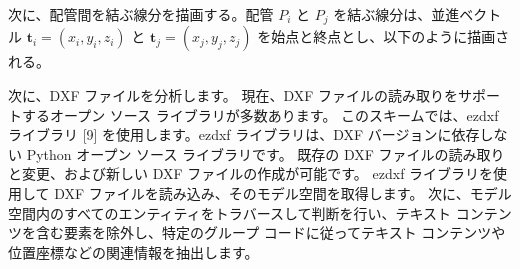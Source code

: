 次に、配管間を結ぶ線分を描画する。配管 \( P_i \) と \( P_j \) を結ぶ線分は、並進ベクトル \( \mathbf{t}_i = (x_i, y_i, z_i) \) と \( \mathbf{t}_j = (x_j, y_j, z_j) \) を始点と終点とし、以下のように描画される。

次に、DXF ファイルを分析します。
現在、DXF ファイルの読み取りをサポートするオープン ソース ライブラリが多数あります。
このスキームでは、ezdxf ライブラリ [9] を使用します。ezdxf ライブラリは、DXF バージョンに依存しない Python オープン ソース ライブラリです。
既存の DXF ファイルの読み取りと変更、および新しい DXF ファイルの作成が可能です。
ezdxf ライブラリを使用して DXF ファイルを読み込み、そのモデル空間を取得します。
次に、モデル空間内のすべてのエンティティをトラバースして判断を行い、テキスト コンテンツを含む要素を除外し、特定のグループ コードに従ってテキスト コンテンツや位置座標などの関連情報を抽出します。

